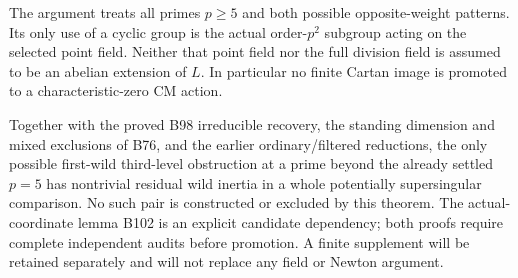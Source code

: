 \begin{remark}
\label{rem:B-RD103-scope}
The argument treats all primes $p\ge5$ and both possible
opposite-weight patterns. Its only use of a cyclic group
is the actual order-$p^2$ subgroup acting on the selected
point field. Neither that point field nor the full division
field is assumed to be an abelian extension of $L$.
In particular no finite Cartan image is promoted to a
characteristic-zero CM action.

Together with the proved B98 irreducible recovery, the
standing dimension and mixed exclusions of B76, and the
earlier ordinary/filtered reductions, the only possible
first-wild third-level obstruction at a prime beyond the
already settled $p=5$ has nontrivial residual wild inertia
in a whole potentially supersingular comparison.
No such pair is constructed or excluded by this theorem.
The actual-coordinate lemma B102 is an explicit candidate
dependency; both proofs require complete independent audits
before promotion. A finite supplement will be retained
separately and will not replace any field or Newton argument.
\end{remark}

